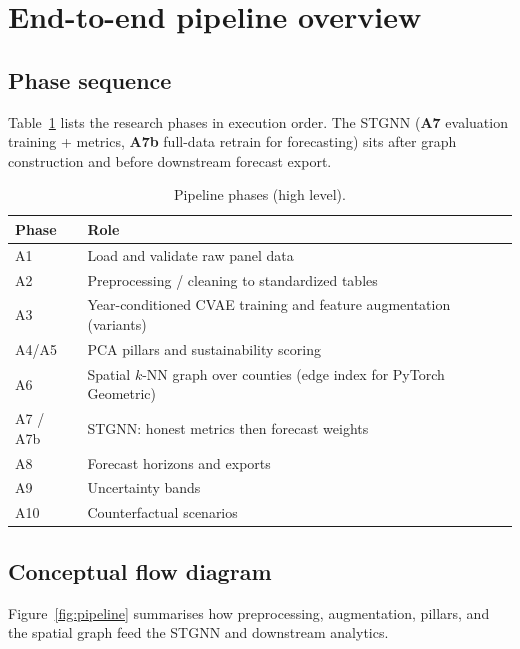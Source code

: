 \documentclass[11pt,a4paper]{article}
\begin{document}
\section{End-to-end pipeline overview}
\subsection{Phase sequence}
Table~\ref{tab:phases} lists the research phases in execution order. The STGNN (\textbf{A7} evaluation training + metrics, \textbf{A7b} full-data retrain for forecasting) sits after graph construction and before downstream forecast export.

\begin{table}[H]
  \centering
  \caption{Pipeline phases (high level).}
  \label{tab:phases}
  \begin{tabular}{@{}ll@{}}
    \toprule
    \textbf{Phase} & \textbf{Role} \\
    \midrule
    A1 & Load and validate raw panel data \\
    A2 & Preprocessing / cleaning to standardized tables \\
    A3 & Year-conditioned CVAE training and feature augmentation (variants) \\
    A4/A5 & PCA pillars and sustainability scoring \\
    A6 & Spatial $k$-NN graph over counties (edge index for PyTorch Geometric) \\
    A7 / A7b & STGNN: honest metrics then forecast weights \\
    A8 & Forecast horizons and exports \\
    A9 & Uncertainty bands \\
    A10 & Counterfactual scenarios \\
    \bottomrule
  \end{tabular}
\end{table}

\subsection{Conceptual flow diagram}
Figure~\ref{fig:pipeline} summarises how preprocessing, augmentation, pillars, and the spatial graph feed the STGNN and downstream analytics.
\end{document}
